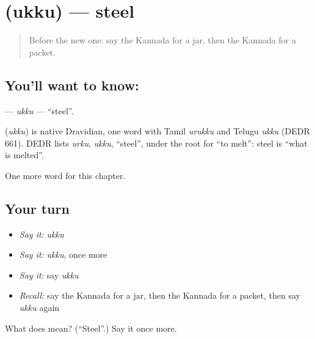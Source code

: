 \section[\texorpdfstring{\kn{ಉಕ್ಕು} (ukku)}{ಉಕ್ಕು (ukku)}]{ (ukku) — steel}

\label{lesson:KA-C265-ukku}



\begin{quote}
Before the new one: say the Kannada for a jar, then the Kannada for a packet.
\end{quote}

\subsection*{You'll want to know: }
\textbf{} — \emph{ukku} — \textquotedblleft{}steel\textquotedblright{}.

\begin{cousinweb}
\textbf{} (\emph{ukku}) is native Dravidian, one word with Tamil \emph{urukku} and Telugu \emph{ukku} (DEDR 661). DEDR lists \emph{urku}, \emph{ukku}, \textquotedblleft{}steel\textquotedblright{}, under the root for \textquotedblleft{}to melt\textquotedblright{}: steel is \textquotedblleft{}what is melted\textquotedblright{}.
\end{cousinweb}

\begin{grammarlens}[title={What you've built}]
One more word for this chapter.
\end{grammarlens}

\subsection*{Your turn}
\begin{itemize}
\raggedright
  \item \emph{Say it:} \emph{ukku}
  \item \emph{Say it:} \emph{ukku}, once more
  \item \emph{Say it:} say \emph{ukku}
  \item \emph{Recall:} say the Kannada for a jar, then the Kannada for a packet, then say \emph{ukku} again
\end{itemize}

\begin{tcolorbox}[breakable,colback=teal!4,colframe=teal!35!black,title={Before you move on}]
What does  mean? (\textquotedblleft{}Steel\textquotedblright{}.) Say it once more.
\end{tcolorbox}
